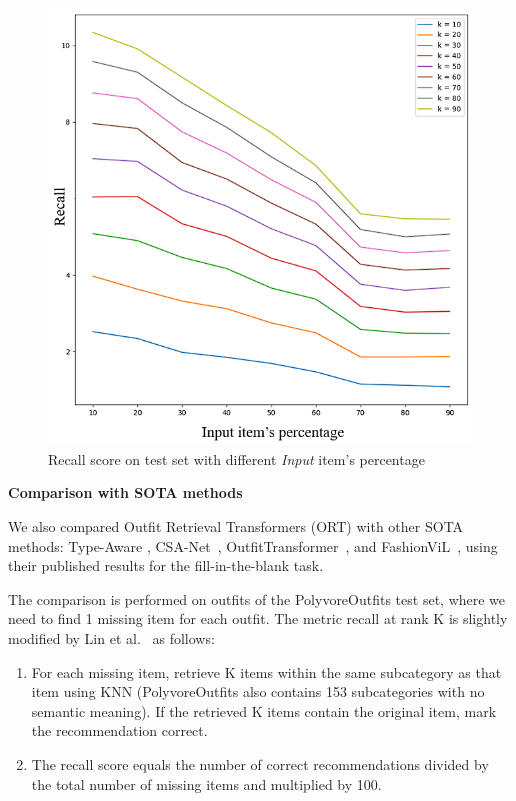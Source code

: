 \begin{figure}[htb!]
    \centering
\includegraphics[width=0.7\linewidth]{content/resources/images/fashion-recommendation/chapter4-masked-ratio.png}
    \caption{Recall score on test set with different \textit{Input} item's percentage}
    \label{fig:chapter4-mask-ratio}
\end{figure}

\textbf{Comparison with SOTA methods}

We also compared Outfit Retrieval Transformers (ORT) with other SOTA methods: Type-Aware \cite{Mariya-ECCV18-Learning}, CSA-Net~\cite{Lin-CVPR2020-Fashion}, OutfitTransformer~\cite{Sarkar-CVPRW2022-OutfitTransformer}, and FashionViL~\cite{Han-ECCV2022-FashionViL}, using their published results for the fill-in-the-blank task.

The comparison is performed on outfits of the PolyvoreOutfits test set, where we need to find 1 missing item for each outfit.
The metric recall at rank K is slightly modified by Lin et al.~\cite{Lin-CVPR2020-Fashion} as follows:
\begin{enumerate}
    \item For each missing item, retrieve K items within the same subcategory as that item using KNN (PolyvoreOutfits also contains 153 subcategories with no semantic meaning). If the retrieved K items contain the original item, mark the recommendation correct.
    \item The recall score equals the number of correct recommendations divided by the total number of missing items and multiplied by 100.
\end{enumerate} 


